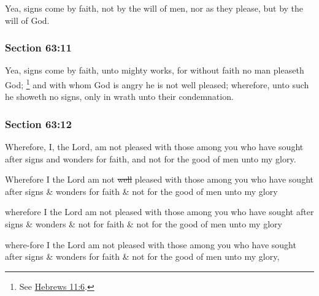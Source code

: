 		Yea, signs come by faith, not by the will of men, nor as they please, but by the will of God.


	\subsubsection{Section 63:11} %
		\label{DC63-11}

		Yea, signs come by faith, unto mighty works, for without faith no man pleaseth God;%
			\footnote{%
				See \hyperref[HEBREWS-11-6]{Hebrews 11:6}.
				}
		and with whom God is angry he is not well pleased; wherefore, unto such he showeth no signs, only in wrath unto their condemnation.


	\subsubsection{Section 63:12} %
		\label{DC63-12}

		Wherefore, I, the Lord, am not pleased with those among you who have sought after signs and wonders for faith, and not for the good of men unto my glory.

		\begin{framed}
		\scriptsize
			\begin{compactdesc}
				\item[JSP] Wherefore I the Lord am not \sout{well} pleased with those among you who have sought after signs \& wonders for faith \& not for the good of men unto my glory
				\item[RB1] wherefore I the Lord am not pleased with those among you who have sought after signs \& wonders \& not for faith \& not for the good of men unto my glory
				\item[Gilbert] where-fore I the Lord am not pleased with those among you who have sought after signs \& wonders for faith \& not for the good of men unto my glory,
			\end{compactdesc}
		\end{framed}

